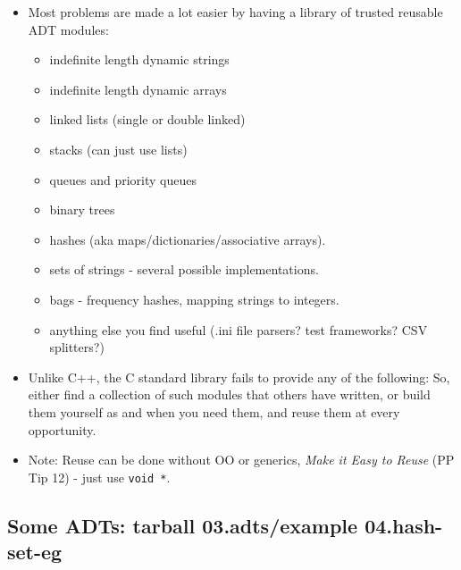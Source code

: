 \documentclass[handout,]{beamer}
\newcommand{\pitem}{\pause \item}
\begin{document}
\begin{frame}[fragile]
    \begin{itemize}
    \item
      Most problems are made a lot easier by having a library
      of trusted reusable ADT modules:
      \begin{itemize}
      \item
      indefinite length \alert{dynamic strings}
      \item
      indefinite length \alert{dynamic arrays}
      \pause
      \item
      \alert{linked lists} (single or double linked)
      \item
      \alert{stacks} (can just use lists)
      \item
      \alert{queues} and \alert{priority queues}
      \item
      \alert{binary trees}
      \pause
      \item
      \alert{hashes} (aka maps/dictionaries/associative arrays).
      \item
      \alert{sets} of strings - several possible implementations.
      \item
      \alert{bags} - frequency hashes, mapping strings to integers.
      \pause
      \item
      anything else you find useful (.ini file parsers? test frameworks?
      CSV splitters?)
      \end{itemize}
    \pitem
      Unlike C++, the C standard library fails to provide any of the following:
      So, either find a collection of such modules that others have
      written, or \alert{build them yourself} as and when you need them, and
      \alert{reuse them} at every opportunity.
    \pitem
      Note: Reuse can be done without OO or generics,
      {\em Make it Easy to Reuse} (PP Tip 12) - just use \verb+void *+.
    \end{itemize}
\end{frame}

\subsection{Some ADTs: tarball 03.adts/example 04.hash-set-eg}
\end{document}
